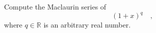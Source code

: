 \label{problemMaclaurin(1+x)^q}
Compute the Maclaurin series of 
\[
(1+x)^q\quad ,
\]
where $q\in \mathbb R$ is an arbitrary real number. 

